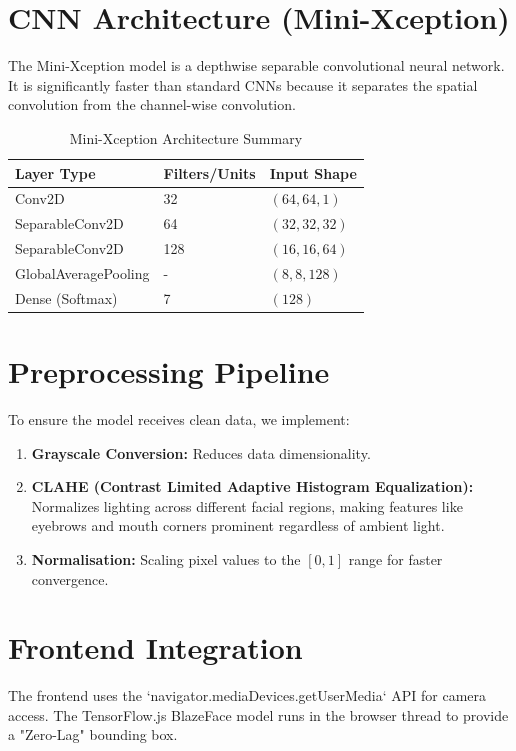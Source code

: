 \documentclass[12pt,a4paper]{report}
\begin{document}
\section{CNN Architecture (Mini-Xception)}
The Mini-Xception model is a depthwise separable convolutional neural network. It is significantly faster than standard CNNs because it separates the spatial convolution from the channel-wise convolution.

\begin{table}[H]
\centering
\begin{tabular}{|l|l|l|}
\hline
\textbf{Layer Type} & \textbf{Filters/Units} & \textbf{Input Shape} \\ \hline
Conv2D & 32 & $(64, 64, 1)$ \\ \hline
SeparableConv2D & 64 & $(32, 32, 32)$ \\ \hline
SeparableConv2D & 128 & $(16, 16, 64)$ \\ \hline
GlobalAveragePooling & - & $(8, 8, 128)$ \\ \hline
Dense (Softmax) & 7 & $(128)$ \\ \hline
\end{tabular}
\caption{Mini-Xception Architecture Summary}
\end{table}

\section{Preprocessing Pipeline}
To ensure the model receives clean data, we implement:
\begin{enumerate}
    \item \textbf{Grayscale Conversion:} Reduces data dimensionality.
    \item \textbf{CLAHE (Contrast Limited Adaptive Histogram Equalization):} Normalizes lighting across different facial regions, making features like eyebrows and mouth corners prominent regardless of ambient light.
    \item \textbf{Normalisation:} Scaling pixel values to the $[0, 1]$ range for faster convergence.
\end{enumerate}

\section{Frontend Integration}
The frontend uses the `navigator.mediaDevices.getUserMedia` API for camera access. The TensorFlow.js BlazeFace model runs in the browser thread to provide a "Zero-Lag" bounding box.
\end{document}
